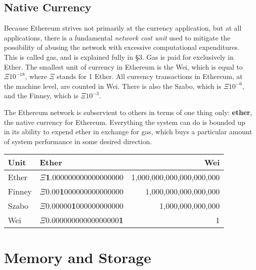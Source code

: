 \documentclass[10pt,letterpaper,leqno,bibliography=totoc]{scrartcl}
\newenvironment{alphafootnotes}
{\par\edef\savedfootnotenumber{\number\value{footnote}}
\renewcommand{\thefootnote}{\alph{footnote}}
\setcounter{footnote}{0}}
{\par\setcounter{footnote}{\savedfootnotenumber}}
\begin{document}
\begin{alphafootnotes}
\begin{multicols*}{2}
\begin{justify}
	 	\subsection{Native Currency}
		Because Ethereum strives not primarily at the currency application, but at all applications, there is a fundamental \textsl{network cost unit} used to mitigate the possibility of abusing the network with excessive computational expenditures. This is called gas, and is explained fully in \S3. Gas is paid for exclusively in Ether. The smallest unit of currency in Ethereum is the Wei, which is equal to $\Xi10^{-18}$, where $\Xi$ stands for 1 Ether. All currency transactions in Ethereum, at the machine level, are counted in Wei. There is also the Szabo, which is $\Xi10^{-6}$,  and the Finney, which is $\Xi10^{-3}$.
		
		The Ethereum network is subservient to others in terms of one thing only: \textbf{ether}, the native currency for Ethereum. Everything the system can do is bounded up in its ability to expend ether in exchange for gas, which buys a particular amount of system performance in some desired direction. 
		
	\end{justify}
\raggedright
		\begin{tabular}{llr}
			\toprule
			\textbf{Unit} & \textbf{Ether} & \textbf{Wei} \\
			\midrule
			\scriptsize{Ether} & \scriptsize{$\Xi$\textbf{1}.000000000000000000} & \scriptsize{1,000,000,000,000,000,000} \\
			\scriptsize{Finney} & \scriptsize{$\Xi$0.00\textbf{1}000000000000000} & \scriptsize{1,000,000,000,000,000} \\
			\scriptsize{Szabo} & \scriptsize{$\Xi$0.00000\textbf{1}000000000000} & \scriptsize{1,000,000,000,000} \\
			\scriptsize{Wei} & \scriptsize{$\Xi$0.00000000000000000\textbf{1}} & \scriptsize{1} \\
			\bottomrule
		\end{tabular}
\justify
		\section{Memory and Storage}
				
				

\end{multicols*}
\end{alphafootnotes}
\end{document}
